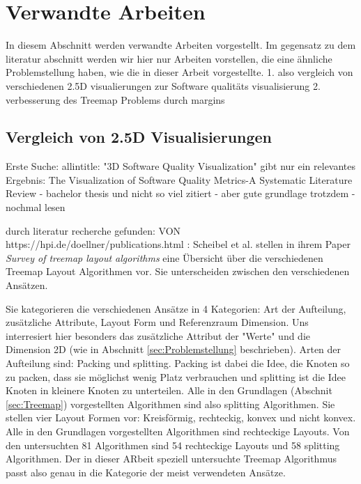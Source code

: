 \chapter{Verwandte Arbeiten} \label{sec:VerwandteArbeiten}
In diesem Abschnitt werden verwandte Arbeiten vorgestellt.
Im gegensatz zu dem literatur abschnitt werden wir hier nur Arbeiten vorstellen, die eine ähnliche Problemstellung haben, wie die in dieser Arbeit vorgestellte.
1. also vergleich von verschiedenen 2.5D visualierungen zur Software qualitäts visualisierung
2. verbesserung des Treemap Problems durch margins



\section{Vergleich von 2.5D Visualisierungen}

Erste Suche: allintitle: "3D Software Quality Visualization"
gibt nur ein relevantes Ergebnis:
The Visualization of Software Quality Metrics-A Systematic Literature Review
- bachelor thesis und nicht so viel zitiert
- aber gute grundlage trotzdem 
- nochmal lesen


durch literatur recherche gefunden: VON https://hpi.de/doellner/publications.html :
Scheibel et al. stellen in ihrem Paper \textit{Survey of treemap layout algorithms}\cite{scheibel2020survey} eine Übersicht über die verschiedenen Treemap Layout Algorithmen vor. Sie unterscheiden zwischen den verschiedenen Ansätzen. 

Sie kategorieren die verschiedenen Ansätze in 4 Kategorien: Art der Aufteilung, zusätzliche Attribute, Layout Form und Referenzraum Dimension. 
Uns interresiert hier besonders das zusätzliche Attribut der "Werte" und die Dimension 2D (wie in Abschnitt \ref{sec:Problemstellung} beschrieben).
Arten der Aufteilung sind: Packing und splitting. Packing ist dabei die Idee, die Knoten so zu packen, dass sie möglichst wenig Platz verbrauchen und splitting ist die Idee Knoten in kleinere Knoten zu unterteilen. Alle in den Grundlagen (Abschnit \ref{sec:Treemap}) vorgestellten Algorithmen sind also splitting Algorithmen.
Sie stellen vier Layout Formen vor: Kreisförmig, rechteckig, konvex und nicht konvex. Alle in den Grundlagen vorgestellten Algorithmen sind rechteckige Layouts.
Von den untersuchten 81 Algorithmen sind 54 rechteckige Layouts und 58 splitting Algorithmen. Der in dieser ARbeit speziell untersuchte Treemap Algorithmus passt also genau in die Kategorie der meist verwendeten Ansätze.


